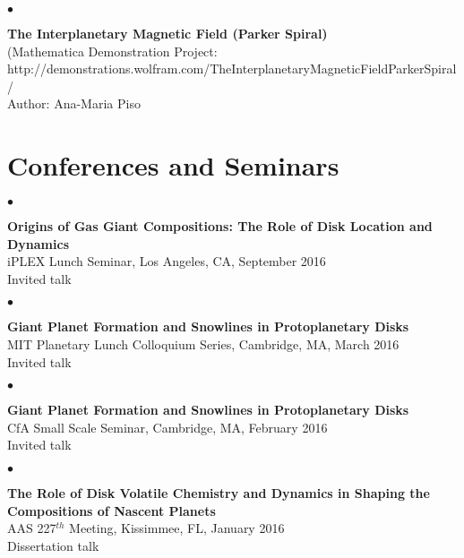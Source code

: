 \documentclass[margin,line]{res}
\newenvironment{list2}{
  \begin{list}{$\bullet$}{%
      \setlength{\itemsep}{0in}
      \setlength{\parsep}{0in} \setlength{\parskip}{0in}
      \setlength{\topsep}{0in} \setlength{\partopsep}{0in} 
      \setlength{\leftmargin}{0.2in}}}{\end{list}}
\begin{document}
\begin{resume}
\vspace*{-.13in}
\begin{list2}
\item[] {\bf The Interplanetary Magnetic Field (Parker Spiral)} \\
(Mathematica Demonstration Project: \\
http://demonstrations.wolfram.com/TheInterplanetaryMagneticFieldParkerSpiral/ \\
Author: Ana-Maria Piso \\
\end{list2}


\section{\sc Conferences and Seminars}

\begin{list2}
\item[] {\bf Origins of Gas Giant Compositions: The Role of Disk Location and Dynamics} \\
iPLEX Lunch Seminar, Los Angeles, CA, September 2016\\
Invited talk \\
\end{list2}

\begin{list2}
\item[] {\bf Giant Planet Formation and Snowlines in Protoplanetary Disks} \\
MIT Planetary Lunch Colloquium Series, Cambridge, MA, March 2016\\
Invited talk \\
\end{list2}

\begin{list2}
\item[] {\bf Giant Planet Formation and Snowlines in Protoplanetary Disks} \\
CfA Small Scale Seminar, Cambridge, MA, February 2016\\
Invited talk \\
\end{list2}

\begin{list2}
\item[] {\bf The Role of Disk Volatile Chemistry and Dynamics in Shaping the Compositions of Nascent Planets} \\
AAS 227$^{th}$ Meeting, Kissimmee, FL, January 2016\\
Dissertation talk \\
\end{list2}


\end{resume}
\end{document}
